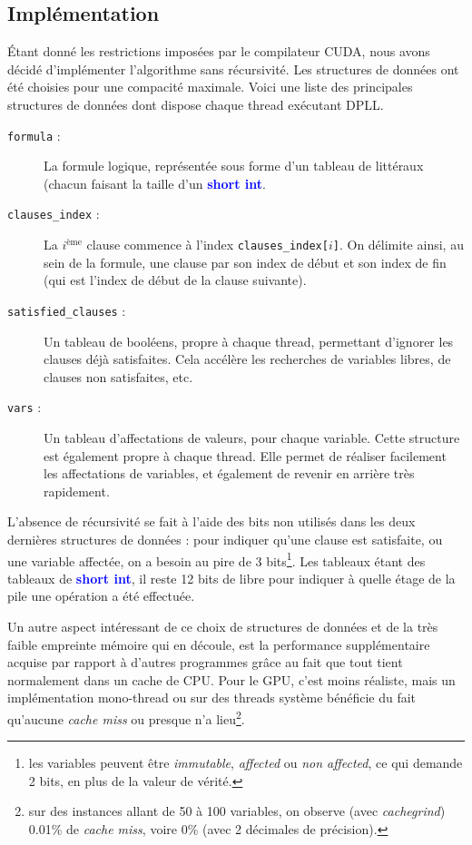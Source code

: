 \documentclass{article}
\newcommand{\keyword}[1]{\textbf{\textcolor{blue}{#1}}}
\newcommand{\code}[1]{\texttt{{#1}}}
\newcommand{\cuda}{\textsc{CUDA}}
\begin{document}
\subsection{Implémentation}
Étant donné les restrictions imposées par le compilateur \cuda, nous avons décidé d'implémenter l'algorithme sans récursivité. Les structures de données ont été choisies pour une compacité maximale. Voici une liste des principales structures de données dont dispose chaque thread exécutant \textsc{DPLL}.
\begin{description}
    \item[\code{formula} :] La formule logique, représentée sous forme d'un tableau de littéraux (chacun faisant la taille d'un \keyword{short int}.
    \item[\code{clauses\_index} :] La $i^{\textrm{ème}}$ clause commence à l'index \code{clauses\_index[$i$]}. On délimite ainsi, au sein de la formule, une clause par son index de début et son index de fin (qui est l'index de début de la clause suivante).
    \item[\code{satisfied\_clauses} :] Un tableau de booléens, propre à chaque thread, permettant d'ignorer les clauses déjà satisfaites. Cela accélère les recherches de variables libres, de clauses non satisfaites, etc.
    \item[\code{vars} :] Un tableau d'affectations de valeurs, pour chaque variable. Cette structure est également propre à chaque thread. Elle permet de réaliser facilement les affectations de variables, et également de revenir en arrière très rapidement.
\end{description}

L'absence de récursivité se fait à l'aide des bits non utilisés dans les deux dernières structures de données : pour indiquer qu'une clause est satisfaite, ou une variable affectée, on a besoin au pire de 3 bits\footnote{les variables peuvent être \emph{immutable}, \emph{affected} ou \emph{non affected}, ce qui demande 2 bits, en plus de la valeur de vérité.}. Les tableaux étant des tableaux de \keyword{short int}, il reste 12 bits de libre pour indiquer à quelle étage de la pile une opération a été effectuée.

Un autre aspect intéressant de ce choix de structures de données et de la très faible empreinte mémoire qui en découle, est la performance supplémentaire acquise par rapport à d'autres programmes grâce au fait que tout tient normalement dans un cache de CPU. Pour le GPU, c'est moins réaliste, mais un implémentation mono-thread ou sur des threads système bénéficie du fait qu'aucune \emph{cache miss} ou presque n'a lieu\footnote{sur des instances allant de 50 à 100 variables, on observe (avec \emph{cachegrind}) 0.01\% de \emph{cache miss}, voire 0\% (avec 2 décimales de précision).}.
\end{document}
